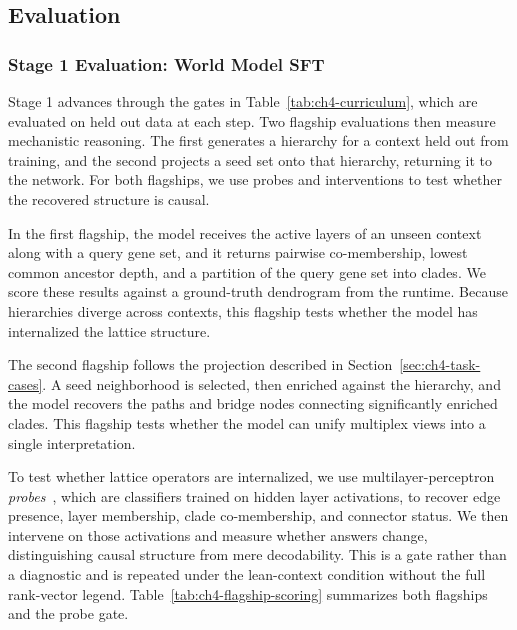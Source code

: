 \subsection{Evaluation}\label{sec:ch4-eval}
\subsubsection{Stage 1 Evaluation: World Model SFT}\label{sec:ch4-stage1-eval}
Stage 1 advances through the gates in Table~\ref{tab:ch4-curriculum}, which are evaluated on held out data at each step. Two flagship evaluations then measure mechanistic reasoning. The first generates a hierarchy for a context held out from training, and the second projects a seed set onto that hierarchy, returning it to the network. For both flagships, we use probes and interventions to test whether the recovered structure is causal.

In the first flagship, the model receives the active layers of an unseen context along with a query gene set, and it returns pairwise co-membership, lowest common ancestor depth, and a partition of the query gene set into clades. We score these results against a ground-truth dendrogram from the runtime. Because hierarchies diverge across contexts, this flagship tests whether the model has internalized the lattice structure.

The second flagship follows the projection described in Section~\ref{sec:ch4-task-cases}. A seed neighborhood is selected, then enriched against the hierarchy, and the model recovers the paths and bridge nodes connecting significantly enriched clades. This flagship tests whether the model can unify multiplex views into a single interpretation.

To test whether lattice operators are internalized, we use multilayer-perceptron \textit{probes}~\cite{alain2016understanding}, which are classifiers trained on hidden layer activations, to recover edge presence, layer membership, clade co-membership, and connector status. We then intervene on those activations and measure whether answers change, distinguishing causal structure from mere decodability. This is a gate rather than a diagnostic and is repeated under the lean-context condition without the full rank-vector legend. Table~\ref{tab:ch4-flagship-scoring} summarizes both flagships and the probe gate.

